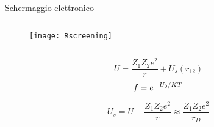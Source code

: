 \begin{frame}{Schermaggio elettronico}

\begin{columns}
\begin{column}{0.6\textwidth}
\begin{figure}[!ht]
       \texttt{[image: Rscreening]}
\end{figure}
\end{column}

\begin{column}{0.4\textwidth}
\end{column}
\end{columns}

\begin{equation}
U=\frac{Z_1Z_2e^2}{r}+U_s(r_{12})
\end{equation}
\begin{equation}
f=e^{-\left.{U_0}\middle/{KT}\right.}\label{eq:screeningfactor}
\end{equation}

\begin{equation}
U_s=U-\frac{Z_1Z_2e^2}{r}\approx\frac{Z_1Z_2e^2}{r_D}
\end{equation}

\end{frame}

